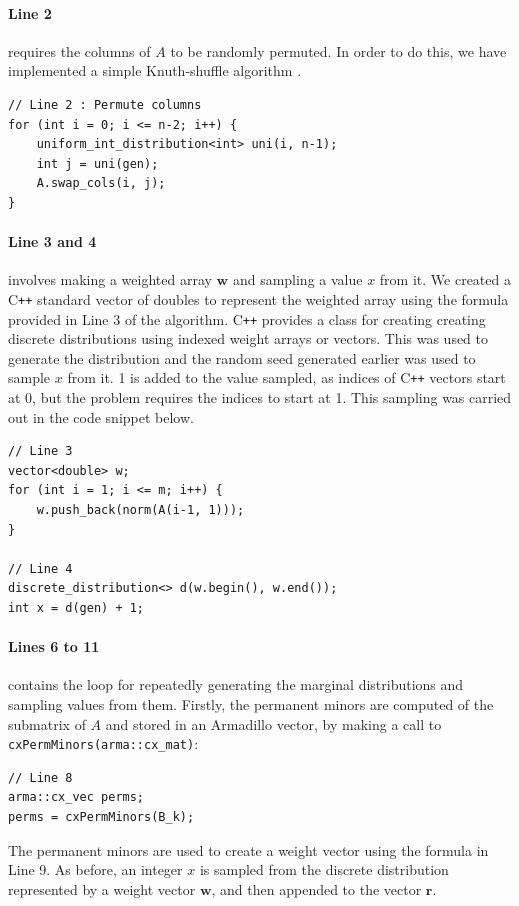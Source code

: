 \documentclass[11pt]{article}
\theoremstyle{theorem}
\theoremstyle{remark}
\theoremstyle{plain}
\theoremstyle{definition}
\begin{document}
\paragraph{Line 2} requires the columns of $A$ to be randomly permuted. In order to do this, we have implemented a simple Knuth-shuffle algorithm \cite{knuth1969}. 
\begin{verbatim}
// Line 2 : Permute columns
for (int i = 0; i <= n-2; i++) {
    uniform_int_distribution<int> uni(i, n-1);
    int j = uni(gen);
    A.swap_cols(i, j);
}
\end{verbatim}
\paragraph{Line 3 and 4} involves making a weighted array $\mathbf{w}$ and sampling a value $x$ from it. We created a C\texttt{++} standard vector of doubles to represent the weighted array using the formula provided in Line 3 of the algorithm. C\texttt{++} provides a class for creating creating discrete distributions using indexed weight arrays or vectors. This was used to generate the distribution and the random seed generated earlier was used to sample $x$ from it. 1 is added to the value sampled, as indices of C\texttt{++} vectors start at 0, but the problem requires the indices to start at 1. This sampling was carried out in the code snippet below.
\begin{verbatim}
// Line 3
vector<double> w;
for (int i = 1; i <= m; i++) {
    w.push_back(norm(A(i-1, 1)));
}

// Line 4
discrete_distribution<> d(w.begin(), w.end());
int x = d(gen) + 1;
\end{verbatim}
\paragraph{Lines 6 to 11} contains the loop for repeatedly generating the marginal distributions and sampling values from them. Firstly, the permanent minors are computed of the submatrix of $A$ and stored in an Armadillo vector, by making a call to \texttt{cxPermMinors(arma::cx_mat)}:
\begin{verbatim}
// Line 8
arma::cx_vec perms;
perms = cxPermMinors(B_k);
\end{verbatim}
The permanent minors are used to create a weight vector using the formula in Line 9. As before, an integer $x$ is sampled from the discrete distribution represented by a weight vector $\mathbf{w}$, and then appended to the vector $\mathbf{r}$.
\end{document}
